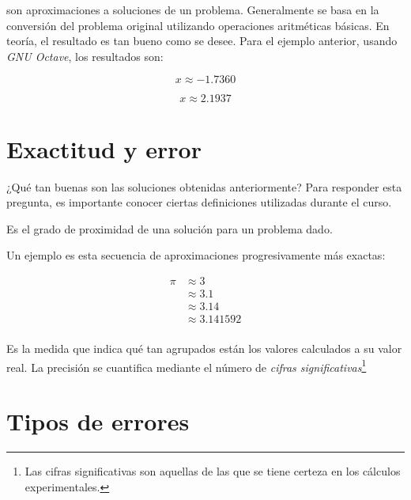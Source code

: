 son aproximaciones a soluciones de un problema. Generalmente se basa en
la conversión del problema original utilizando operaciones aritméticas
básicas. En teoría, el resultado es tan bueno como se desee. Para el
ejemplo anterior, usando \emph{GNU Octave}, los resultados son:

\begin{equation}{
        x \approx -1.7360
}\end{equation}

\begin{equation}{
        x \approx 2.1937
}\end{equation}

\section{Exactitud y error}

¿Qué tan buenas son las soluciones obtenidas anteriormente? Para
responder esta pregunta, es importante conocer ciertas definiciones
utilizadas durante el curso.

\begin{definition}[Exactitud]
    Es el grado de proximidad de una solución para un problema dado.


\end{definition}

\begin{eg}
    Un ejemplo es esta secuencia de aproximaciones progresivamente más exactas:

    \begin{align*} 
        \pi &\approx 3 \\ 
            &\approx 3.1 \\ 
            &\approx 3.14 \\ 
            &\approx 3.141592 \\ 
    \end{align*}

\end{eg}

\begin{definition}[Precisión]
    Es la medida que indica qué tan agrupados están los valores calculados a
    su valor real. La precisión se cuantifica mediante el número de
    \emph{cifras significativas}\footnote{Las cifras significativas son
    aquellas de las que se tiene certeza en los cálculos experimentales.}
\end{definition}


\section{Tipos de errores}

